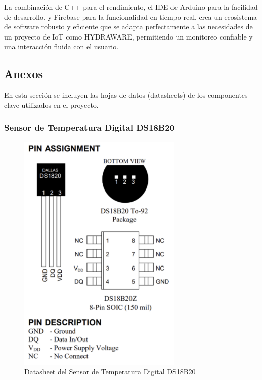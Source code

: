 \documentclass[a4paper,12pt]{article}
\begin{document}
	La combinación de C++ para el rendimiento, el IDE de Arduino para la facilidad de desarrollo, y Firebase para la funcionalidad en tiempo real, crea un ecosistema de software robusto y eficiente que se adapta perfectamente a las necesidades de un proyecto de IoT como HYDRAWARE, permitiendo un monitoreo confiable y una interacción fluida con el usuario.
	
	\newpage
	
	\subsection{Anexos}
	
	En esta sección se incluyen las hojas de datos (datasheets) de los componentes clave utilizados en el proyecto.
	
	\subsubsection{Sensor de Temperatura Digital DS18B20}
	\begin{figure}[H]
		\centering
		\includegraphics[width=0.7\textwidth]{temperatura.png}
		\caption{Datasheet del Sensor de Temperatura Digital DS18B20}
		\label{fig:ds18b20_datasheet}
	\end{figure}
	
\end{document}
